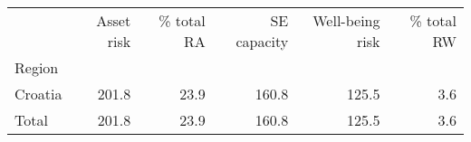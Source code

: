 \begin{tabular}{lrrrrr}
\toprule
{} &  Asset risk &  \% total RA &  SE capacity &  Well-being risk &  \% total RW \\
Region  &             &             &              &                  &             \\
\midrule
Croatia &       201.8 &        23.9 &        160.8 &            125.5 &         3.6 \\
Total   &       201.8 &        23.9 &        160.8 &            125.5 &         3.6 \\
\bottomrule
\end{tabular}
